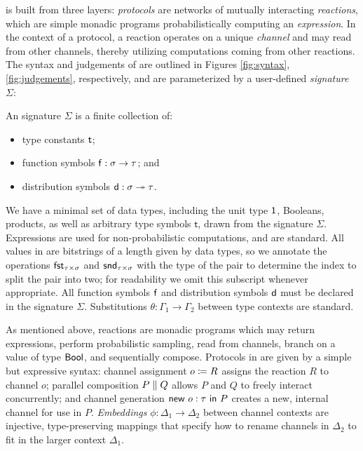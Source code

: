 \newcommand{\Sim}{\mathsf{Sim}}

\ipdl is built from three layers: \emph{protocols} are networks of
mutually interacting \emph{reactions}, which are simple monadic programs probabilistically computing an \emph{expression}. In the context of a protocol, a reaction operates on a unique \emph{channel} and may read from other channels, thereby utilizing computations coming from other reactions. The syntax and judgements of \ipdl are outlined in Figures \ref{fig:syntax}, \ref{fig:judgements}, respectively, and are parameterized by a user-defined \emph{signature} $\Sigma$:

\begin{definition}[Signature]
An \ipdl signature $\Sigma$ is a finite collection of:
\begin{itemize}
\item type constants $\mathsf{t}$;
\item function symbols $\mathsf{f} : \sigma \rightarrow \tau$; and
\item distribution symbols $\mathsf{d} : \sigma \twoheadrightarrow \tau$.
\end{itemize}
\end{definition}

We have a minimal set of data types, including the unit type $\mathsf{1}$, Booleans, products, as well as arbitrary type symbols $\mathsf{t}$, drawn from the signature $\Sigma$. Expressions are used for non-probabilistic computations, and are standard. All values in \ipdl are bitstrings of a length given by data types, so we annotate the operations $\mathsf{fst}_{\tau \times \sigma}$ and $\mathsf{snd}_{\tau \times \sigma}$ with the type of the pair to determine the index to split the pair into two; for readability we omit this subscript whenever appropriate. All function symbols $\mathsf{f}$ and distribution symbols $\mathsf{d}$ must be declared in the signature $\Sigma$. Substitutions $\theta : \Gamma_1 \to \Gamma_2$ between type contexts are standard.

As mentioned above, reactions are monadic programs which may return expressions, perform probabilistic sampling, read from channels, branch on a value of type $\mathsf{Bool}$, and sequentially compose. Protocols in \ipdl are given by a simple but expressive syntax: channel assignment $o \coloneqq R$ assigns the reaction $R$ to channel $o$; parallel composition $P \; \| \; Q$ allows $P$ and $Q$ to freely interact concurrently; and channel generation $\mathsf{new} \ o : \tau \ \mathsf{in} \ P$ creates a new, internal channel for use in $P$. \emph{Embeddings} $\phi : \Delta_1 \to \Delta_2$ between channel contexts are injective, type-preserving mappings that specify how to rename channels in $\Delta_2$ to fit in the larger context $\Delta_1$.

